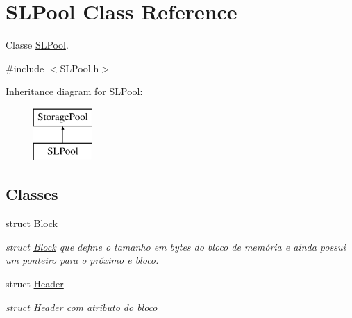\hypertarget{class_s_l_pool}{}\section{S\+L\+Pool Class Reference}
\label{class_s_l_pool}


Classe \hyperlink{class_s_l_pool}{S\+L\+Pool}.  




{\ttfamily \#include $<$S\+L\+Pool.\+h$>$}

Inheritance diagram for S\+L\+Pool\+:\begin{figure}[H]
\begin{center}
\leavevmode
\includegraphics[height=2.000000cm]{class_s_l_pool}
\end{center}
\end{figure}
\subsection*{Classes}
\begin{DoxyCompactItemize}
\item 
struct \hyperlink{struct_s_l_pool_1_1_block}{Block}
\begin{DoxyCompactList}\small\item\em struct \hyperlink{struct_s_l_pool_1_1_block}{Block} que define o tamanho em bytes do bloco de memória e ainda possui um ponteiro para o próximo e bloco. \end{DoxyCompactList}\item 
struct \hyperlink{struct_s_l_pool_1_1_header}{Header}
\begin{DoxyCompactList}\small\item\em struct \hyperlink{struct_s_l_pool_1_1_header}{Header} com atributo do bloco \end{DoxyCompactList}\end{DoxyCompactItemize}
